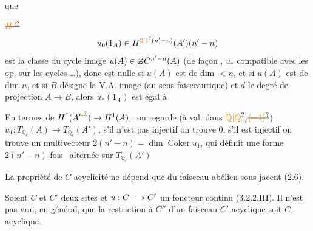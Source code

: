  que

$\deleted{\unsure{H^0}}$
\[
 u_0(1_A)\in H^{\unsure{2|1}(n'-n)}(A')(n'-n)
\]
est la classe du cycle image $u(A)\in\deleted{Z}C^{n'-n}(A)$ (de façon , $u_*$ compatible avec les op.  sur les cycles \ldots), donc
est nulle si $u(A)$ est de dim $<n$, et si $u(A)$ est de dim $n$, et si $B$ désigne la V.A.  image (au sens faisceautique) et $d$ le degré de projection $A\to B$,
alors $u_*(1_A)$ est égal à

En termes de $H^1(A'^{\deleted{\unsure{*}}})\to H^1(A)$ : on regarde  (à val. dans $\unsure{\mathbb Q|Q}_\ell\deleted{\unsure{(-1)}}$)
$u_1:T_{\mathbb Q_\ell}(A)\longrightarrow T_{\mathbb Q_\ell}(A')$,  s'il n'est pas
injectif on trouve $0$, s'il est injectif on trouve un multivecteur  $2(n'-n)=\dim\operatorname{Coker}u_1$, qui définit une forme $2(n'-n)$-fois \ alternée sur $T_{\mathbb Q_\ell}(A')$

La propriété de $C$-acyclicité ne dépend que du faisceau abélien sous-jacent (2.6).

Soient $C$ et $C'$ deux sites et $u:C\mathrel{\relbar\joinrel\handwritten{\rightarrow}}C'$ un foncteur continu (3.2.2.III). Il n'est pas vrai, en général, que la restriction à $C''$ d'un faisceau $C'$-acyclique soit $C$-acyclique.

